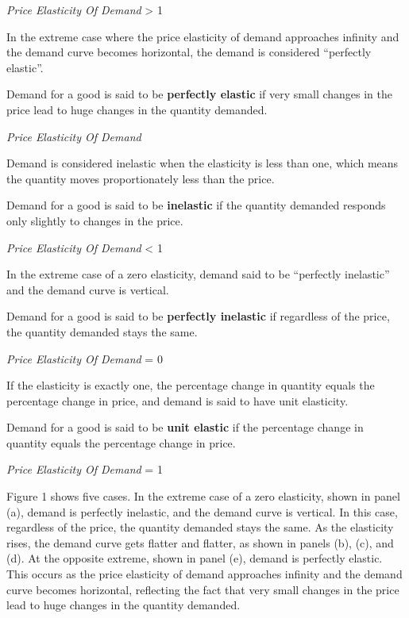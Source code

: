 \bse
\textit{Price Elasticity Of Demand} > 1
\ese
\ed

In the extreme case where the price elasticity of demand approaches infinity and the demand curve becomes horizontal,
the demand is considered ``perfectly elastic''.

Demand for a good is said to be \textbf{perfectly elastic} if very small changes in the price lead to huge changes in
the quantity demanded.

\bse
\textit{Price Elasticity Of Demand} \to \infty
\ese
\ed

Demand is considered inelastic when the elasticity is less than one, which means the quantity moves proportionately
less than the price.

Demand for a good is said to be \textbf{inelastic} if the quantity demanded responds only slightly to changes in the
price.

\bse
\textit{Price Elasticity Of Demand} < 1
\ese
\ed

In the extreme case of a zero elasticity, demand said to be ``perfectly inelastic'' and the demand curve is vertical.

Demand for a good is said to be \textbf{perfectly inelastic} if regardless of the price, the quantity demanded stays
the same.

\bse
\textit{Price Elasticity Of Demand} = 0
\ese
\ed

If the elasticity is exactly one, the percentage change in quantity equals the percentage change in price, and demand
is said to have unit elasticity.

Demand for a good is said to be \textbf{unit elastic} if the percentage change in quantity equals the percentage
change in price.

\bse
\textit{Price Elasticity Of Demand} = 1
\ese
\ed

Figure 1 shows five cases. In the extreme case of a zero elasticity, shown in panel (a), demand is perfectly
inelastic, and the demand curve is vertical. In this case, regardless of the price, the quantity demanded stays the
same. As the elasticity rises, the demand curve gets flatter and flatter, as shown in panels (b), (c), and (d). At
the opposite extreme, shown in panel (e), demand is perfectly elastic. This occurs as the price elasticity of demand
approaches infinity and the demand curve becomes horizontal, reflecting the fact that very small changes in the price
lead to huge changes in the quantity demanded.

